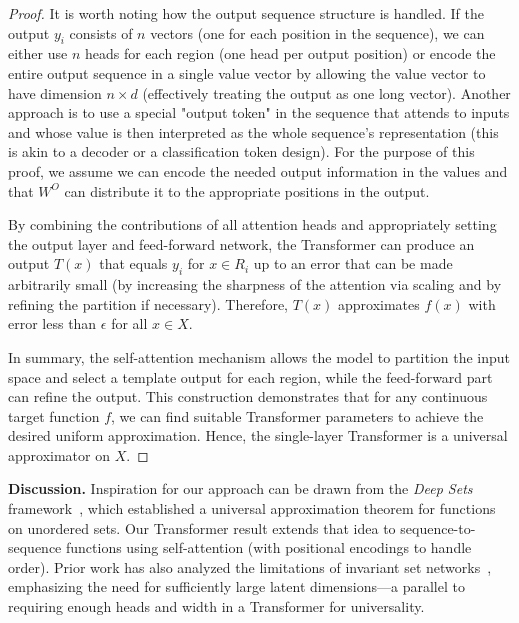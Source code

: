 \documentclass[conference]{IEEEtran}
\begin{document}
\begin{proof}
It is worth noting how the output sequence structure is handled. If the output $y_i$ consists of $n$ vectors (one for each position in the sequence), we can either use $n$ heads for each region (one head per output position) or encode the entire output sequence in a single value vector by allowing the value vector to have dimension $n \times d$ (effectively treating the output as one long vector). Another approach is to use a special "output token" in the sequence that attends to inputs and whose value is then interpreted as the whole sequence's representation (this is akin to a decoder or a classification token design). For the purpose of this proof, we assume we can encode the needed output information in the values and that $W^O$ can distribute it to the appropriate positions in the output.

By combining the contributions of all attention heads and appropriately setting the output layer and feed-forward network, the Transformer can produce an output $T(x)$ that equals $y_i$ for $x \in R_i$ up to an error that can be made arbitrarily small (by increasing the sharpness of the attention via scaling and by refining the partition if necessary). Therefore, $T(x)$ approximates $f(x)$ with error less than $\epsilon$ for all $x \in X$.

In summary, the self-attention mechanism allows the model to partition the input space and select a template output for each region, while the feed-forward part can refine the output. This construction demonstrates that for any continuous target function $f$, we can find suitable Transformer parameters to achieve the desired uniform approximation. Hence, the single-layer Transformer is a universal approximator on $X$.
\end{proof}

\noindent \textbf{Discussion.} Inspiration for our approach can be drawn from the \emph{Deep Sets} framework~\cite{zaheer2017}, which established a universal approximation theorem for functions on unordered sets. Our Transformer result extends that idea to sequence-to-sequence functions using self-attention (with positional encodings to handle order). Prior work has also analyzed the limitations of invariant set networks~\cite{wagstaff2019}, emphasizing the need for sufficiently large latent dimensions---a parallel to requiring enough heads and width in a Transformer for universality. 
\end{document}
